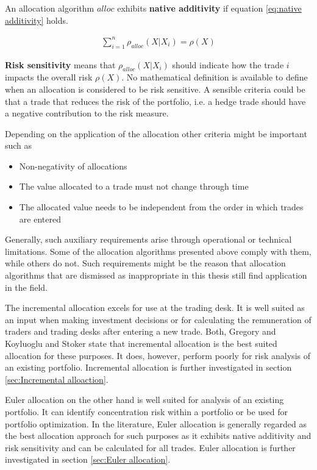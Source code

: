 \documentclass[../Thesis_AHoecherl.tex]{subfiles}
\begin{document}
An allocation algorithm $alloc$ exhibits \textbf{native additivity} if equation \ref{eq:native additivity} holds.

\begin{align}
    \sum_{i=1}^n{\rho_{alloc}\left(X|X_i\right)} = \rho\left(X\right)
    \label{eq:native additivity}
\end{align}

\textbf{Risk sensitivity} means that $\rho_{alloc}\left(X|X_i\right)$ should indicate how the trade $i$ impacts the overall risk $\rho\left(X\right)$. 
No mathematical definition is available to define when an allocation is considered to be risk sensitive. A sensible criteria could be that a trade that reduces the risk of the portfolio, i.e. a hedge trade should have a negative contribution to the risk measure.

Depending on the application of the allocation other criteria might be important such as
\begin{itemize}
    \item Non-negativity of allocations
    \item The value allocated to a trade must not change through time
    \item The allocated value needs to be independent from the order in which trades are entered 
\end{itemize}
Generally, such auxiliary requirements arise through operational or technical limitations. Some of the allocation algorithms presented above comply with them, while others do not. 
Such requirements might be the reason that allocation algorithms that are dismissed as inappropriate in this thesis still find application in the field.

The incremental allocation excels for use at the trading desk. It is well suited as an input when making investment decisions or for calculating the remuneration of traders and trading desks after entering a new trade.
Both, Gregory \cite{gregory2015xva} and Koyluoglu and Stoker \cite{koyluoglu2002risk} state that incremental allocation is the best suited allocation for these purposes. It does, however, perform poorly for risk analysis of an existing portfolio. Incremental allocation is further investigated in section \ref{sec:Incremental alloaction}.

Euler allocation on the other hand is well suited for analysis of an existing portfolio. It can identify concentration risk within a portfolio or be used for portfolio optimization. 
In the literature, Euler allocation is generally regarded as the best allocation approach for such purposes as it exhibits native additivity and risk sensitivity and can be calculated for all trades. Euler allocation is further investigated in section \ref{sec:Euler allocation}.
\end{document}
